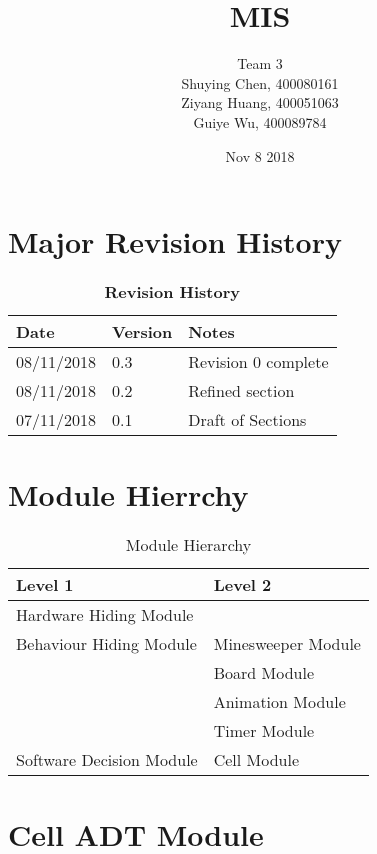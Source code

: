\documentclass[12pt]{article}
\title{MIS}
\author{Team 3\\
        Shuying Chen, 400080161\\
        Ziyang Huang, 400051063\\
        Guiye Wu, 400089784
}
\date{Nov 8 2018}
\begin{document}
\maketitle
\newpage

\tableofcontents
\listoftables
\listoffigures


\newpage

\section{Major Revision History} 
\begin{table}[h!]
\caption{\bf Revision History}
\begin{tabularx}{\textwidth}{p{3cm}p{2cm}X}
\toprule {\bf Date} & {\bf Version} & {\bf Notes}\\
\midrule
08/11/2018& 0.3 & Revision 0 complete\\
08/11/2018& 0.2 & Refined section\\
07/11/2018 & 0.1 & Draft of Sections\\
\bottomrule
\end{tabularx}
\end{table}

\section{Module Hierrchy}
\begin{table}[!htbp]
        \begin{tabular}{ll}
        \toprule
        Level 1 & Level 2 \\
        \midrule
        Hardware Hiding Module & \\
         \midrule
        Behaviour Hiding Module & Minesweeper Module \\
        & Board Module\\
        &Animation Module\\
        &Timer Module\\
		 \midrule
        Software Decision Module & Cell Module\\
        \bottomrule
        \end{tabular}
        \caption{Module Hierarchy}
        \label{Table 1}
        \end{table}
\newpage
\section {Cell ADT Module}
\end{document}
